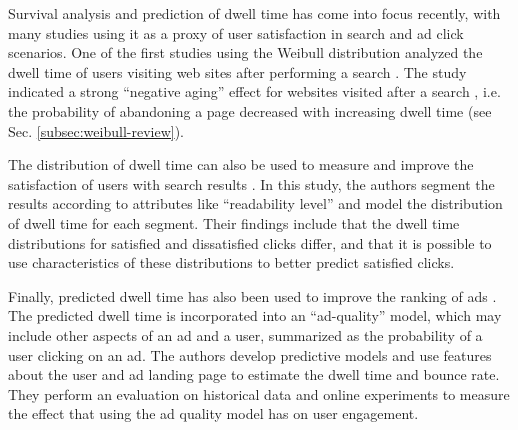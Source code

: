 %

Survival analysis and prediction of dwell time has come into focus recently,
with many studies using it as a proxy of user satisfaction in
search and ad click scenarios. One of the first studies using
the Weibull distribution analyzed the
dwell time of users
visiting web sites after performing a search \cite{liu2010weibull}. The study indicated a strong
``negative aging'' effect for websites visited after a search
, i.e. the probability of abandoning a page decreased with increasing dwell time (see Sec. \ref{subsec:weibull-review}).

The distribution of dwell time can also be used to measure and improve the
satisfaction of users with search results \cite{Kim2014satisfaction}.
In this study, the authors segment the results according
to attributes like ``readability level'' and model the distribution
of dwell time for each segment. Their findings include that the
dwell time distributions for satisfied and dissatisfied clicks differ,
and that it is possible to use characteristics of these distributions
to better predict satisfied clicks.

Finally, predicted dwell time has also been used to improve the ranking of
ads \cite{Barbieri2016RSFclick, lalmas2015gemini}.
The predicted dwell time is incorporated
into an ``ad-quality'' model, which may include other aspects
of an ad and a user, summarized as the probability of a user clicking on
an ad. The authors develop predictive models and use features about the
user and ad landing page to estimate the dwell time and bounce rate. They perform an evaluation
on historical data and online experiments to measure the effect
that using the ad quality model has on user engagement.
